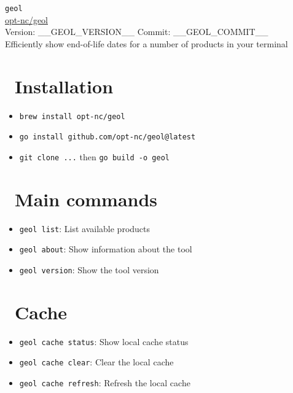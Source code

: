\documentclass[a4paper,10pt]{article}
\author{\href{https://github.com/opt-nc/geol}{opt-nc/geol}}
\date{Version: __GEOL_VERSION__ \quad Commit: __GEOL_COMMIT__}
\newcommand{\cmd}[1]{\textcolor{geolgreen}{\texttt{#1}}}
\newenvironment{geolitemize}{%
  \begin{itemize}\setlength{\itemsep}{0.1em}\setlength{\parskip}{0pt}\setlength{\topsep}{0pt}
}{\end{itemize}}
\renewcommand{\maketitle}{%
  \begin{center}
    \begin{terminaltitle}
      \centering
      {\textcolor{geolgreen}{\texttt{geol}}} \\
      {\color{white}\href{https://github.com/opt-nc/geol}{opt-nc/geol}} \\
  {\color{white}\small Version: __GEOL_VERSION__ \quad Commit: __GEOL_COMMIT__}\\
  {\color{white}\small Efficiently show end-of-life dates for a number of products in your terminal}
    \end{terminaltitle}
  \end{center}
}
\begin{document}
\maketitle
\renewcommand{\thefootnote}{\fnsymbol{footnote}}





\begin{multicols}{2}

\section*{\faDownload\ Installation}

\begin{geolbox}
\begin{geolitemize}
  \item \cmd{brew install opt-nc/geol}
  \item \cmd{go install github.com/opt-nc/geol@latest}
  \item \cmd{git clone ...} then \cmd{go build -o geol}
\end{geolitemize}
\end{geolbox}


\section*{\faTerminal\ Main commands}

\begin{geolbox}
\begin{geolitemize}
  \item \cmd{geol list}: List available products
  \item \cmd{geol about}: Show information about the tool
  \item \cmd{geol version}: Show the tool version
\end{geolitemize}
\end{geolbox}

\section*{\faDatabase\ Cache}
\begin{geolbox}
\begin{geolitemize}
  \item \cmd{geol cache status}: Show local cache status
  \item \cmd{geol cache clear}: Clear the local cache
  \item \cmd{geol cache refresh}: Refresh the local cache
\end{geolitemize}
\end{geolbox}


\end{multicols}
\end{document}
